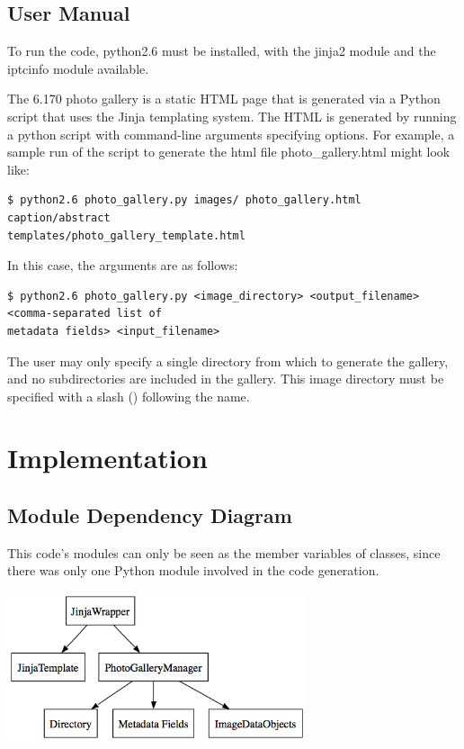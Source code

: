 \documentclass[11pt,letterpaper]{article}
\begin{document}
\subsection{User Manual}
To run the code, python2.6 must be installed, with the jinja2 module and the iptcinfo module available.

The 6.170 photo gallery is a static HTML page that is generated via a Python script that uses the Jinja templating system. The HTML is generated by running a python script with command-line arguments specifying options.
For example, a sample run of the script to generate the html file photo\_gallery.html might look like:
\begin{verbatim}
$ python2.6 photo_gallery.py images/ photo_gallery.html caption/abstract
templates/photo_gallery_template.html
\end{verbatim}
In this case, the arguments are as follows:
\begin{verbatim}
$ python2.6 photo_gallery.py <image_directory> <output_filename> <comma-separated list of
metadata fields> <input_filename>
\end{verbatim}

The user may only specify a single directory from which to generate the gallery, and no subdirectories are included in the gallery. This image directory must be specified with a slash (\/) following the name.


\section{Implementation}

\subsection{Module Dependency Diagram}
This code's modules can only be seen as the member variables of classes, since there was only one Python module involved in the code generation.
\begin{center}
\includegraphics[width=250pt]{dot/moddepdiagram.png}
\label{fig:ob2} 
\end{center}
\end{document}
